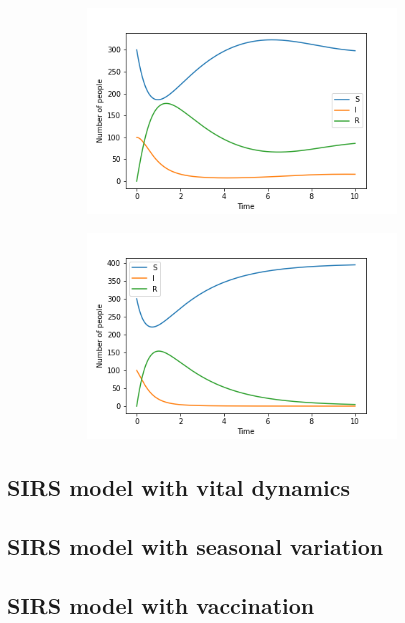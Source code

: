 \documentclass[../main.tex]{subfiles}
\begin{document}
\begin{figure}[htb!]
    \begin{subfigure}[b]{0.475\textwidth}
    \centering
    \includegraphics[width=0.9\textwidth]{../figures/SIRS_rk4_b=3.png}
    \caption{}
    \label{fig:b=3}
    \end{subfigure}
    \quad
    \begin{subfigure}[b]{0.475\textwidth}
    \includegraphics[width=0.9\textwidth]{../figures/SIRS_rk4_b=4.png}
    \caption{}
    \label{fig:b=4}
    \end{subfigure}
    \caption{}
    \label{fig:SIRS_rk4}
\end{figure}

\subsection{SIRS model with vital dynamics}

\subsection{SIRS model with seasonal variation}

\subsection{SIRS model with vaccination}
\end{document}
